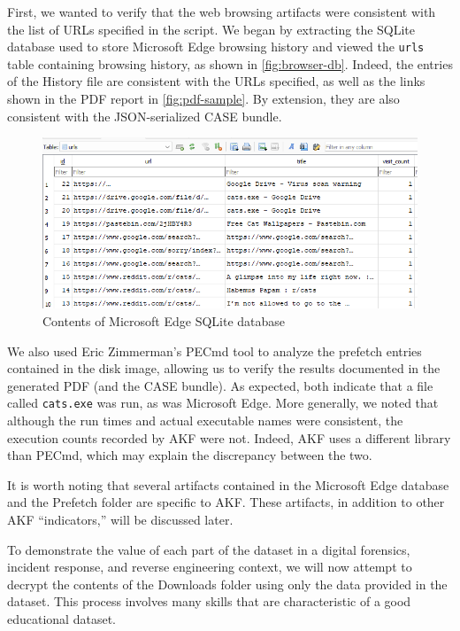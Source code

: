 \documentclass[final,5p,times,twocolumn]{elsarticle}
\newcommand{\passthrough}[1]{#1}
\begin{document}
First, we wanted to verify that the web browsing artifacts were
consistent with the list of URLs specified in the script. We began by
extracting the SQLite database used to store Microsoft Edge browsing
history and viewed the \passthrough{\lstinline!urls!} table containing
browsing history, as shown in \autoref{fig:browser-db}. Indeed, the
entries of the History file are consistent with the URLs specified, as
well as the links shown in the PDF report in \autoref{fig:pdf-sample}.
By extension, they are also consistent with the JSON-serialized CASE
bundle.

\begin{figure}[htbp]
\centering
\includegraphics[width=1\linewidth]{browser-db.png}
\caption{Contents of Microsoft Edge SQLite
database}\label{fig:browser-db}
\end{figure}

We also used Eric Zimmerman's PECmd tool to analyze the prefetch entries
contained in the disk image, allowing us to verify the results
documented in the generated PDF (and the CASE bundle). As expected, both
indicate that a file called \passthrough{\lstinline!cats.exe!} was run,
as was Microsoft Edge. More generally, we noted that although the run
times and actual executable names were consistent, the execution counts
recorded by AKF were not. Indeed, AKF uses a different library than
PECmd, which may explain the discrepancy between the two.

It is worth noting that several artifacts contained in the Microsoft
Edge database and the Prefetch folder are specific to AKF. These
artifacts, in addition to other AKF ``indicators,'' will be discussed
later.

To demonstrate the value of each part of the dataset in a digital
forensics, incident response, and reverse engineering context, we will
now attempt to decrypt the contents of the Downloads folder using only
the data provided in the dataset. This process involves many skills that
are characteristic of a good educational dataset.
\end{document}
